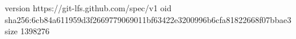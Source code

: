 version https://git-lfs.github.com/spec/v1
oid sha256:6cb84a611959d3f2669779069011bf63422e3200996b6cfa81822668f07bbae3
size 1398276
